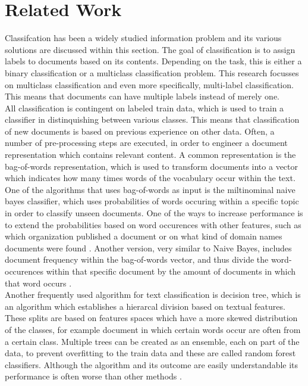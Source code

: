 \section{Related Work}
\label{sec:rel}
Classifcation has been a widely studied information problem and its various solutions are discussed within this section. The goal of classification is to assign labels to documents based on its contents. Depending on the task, this is either a binary classification or a multiclass classification problem. This research focusses on multiclass classification and even more specifically, multi-label classification. This means that documents can have multiple labels instead of merely one.\\
All classification is contingent on labeled train data, which is used to train a classifier in distinquishing between various classes. This means that classification of new documents is based on previous experience on other data. Often, a number of pre-processing steps are executed, in order to engineer a document representation which contains relevant content. A common representation is the bag-of-words representation, which is used to transform documents into a vector which indicates how many times words of the vocabulary occur within the text.\\
One of the algorithms that uses bag-of-words as input is the miltinominal naive bayes classifier, which uses probabilities of words occuring within a specific topic in order to classify unseen documents. One of the ways to increase performance is to extend the probabilities based on word occurences with other features, such as which organization published a document or on what kind of domain names documents were found \cite{sahami1998bayesian}. Another version, very similar to Naive Bayes, includes document frequency within the bag-of-words vector, and thus divide the word-occurences within that specific document by the amount of documents in which that word occurs \cite{joachims1996probabilistic}. \\
Another frequently used algorithm for text classification is decision tree, which is an algorithm which establishes a hierarcal division based on textual features. These splits are based on features spaces which have a more skewed distribution of the classes, for example document in which certain words occur are often from a certain class. Multiple trees can be created as an ensemble, each on part of the data, to prevent overfitting to the train data and these are called random forest classifiers. Although the algorithm and its outcome are easily understandable its performance is often worse than other methods \cite{li1998classification}.\\
